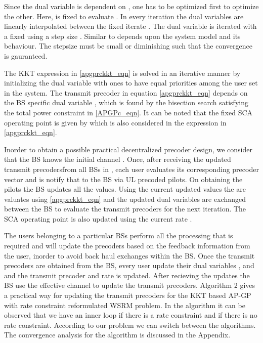 Since the dual variable  is dependent on , one has to be optimized first to optimize the other. Here,  is fixed to evaluate . In every iteration the dual variables are linearly interpolated between the fixed iterate . The dual variable  is iterated with a fixed  using a step size \me{\rho}. Similar to \me{\rho} depends upon the system model and its behaviour. The stepsize \me{\rho} must be small or diminishing such that the convergence is gauranteed.

The \ac{KKT} expression in \eqref{apgprckkt_eqn} is solved in an iterative manner by initializing the dual variable  with ones to have equal priorities among the user set in the system. The transmit precoder  in equation \eqref{apgprckkt_eqn} depends on the \ac{BS} specific dual variable , which is found by the bisection search satisfying the total power constraint in \eqref{APGPc_eqn}. It can be noted that the fixed \ac{SCA} operating point is given by  which is also considered in the expression in \eqref{apgprckkt_eqn}.

Inorder to obtain a possible practical decentralized precoder design, we consider that the \ac{BS}  knows the initial channel . Once, after receiving the updated transmit precodersfrom all \ac{BS}s in , each user evaluates its corresponding precoder vector and is notify that to the \ac{BS} via \ac{UL} precoded pilots. On obtaining the pilots the \ac{BS} updates all the values. Using the current updated values the  are valuates using \eqref{apgprckkt_eqn} and the updated dual variables are exchanged between the \ac{BS} to evaluate the transmit precoders for the next iteration. The \ac{SCA} operating point is also updated using the current rate . 

The users belonging to a particular \ac{BS}s perform all the processing that is required and will update the precoders based on the feedback information from the user, inorder to avoid back haul exchanges within the \ac{BS}. Once the transmit precoders are obtained from the \ac{BS}, every user update their dual variables ,  and  and the transmit precoder  and rate  is updated. After recieving the updates the \ac{BS} use the effective channel to update the transmit precoders. Algorithm 2 gives a practical way for updating the transmit precoders for the \ac{KKT} based AP-GP with rate constraint reformulated \ac{WSRM} problem. In the algorithm it can be observed that we have an inner loop if there is a rate constraint and if there is no rate constraint. According to our problem we can switch between the algorithms. The convergence analysis for the algorithm is discussed in the Appendix.


